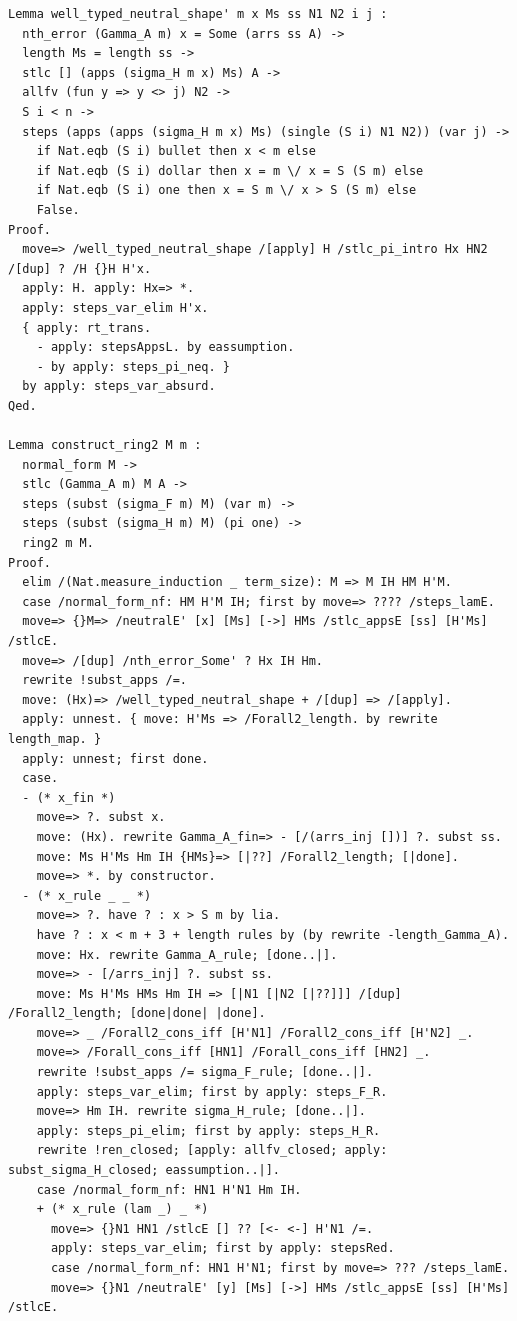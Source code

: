 \documentclass[10pt,a4paper]{amsart}
\begin{document}
\begin{lstlisting}
Lemma well_typed_neutral_shape' m x Ms ss N1 N2 i j :
  nth_error (Gamma_A m) x = Some (arrs ss A) ->
  length Ms = length ss ->
  stlc [] (apps (sigma_H m x) Ms) A ->
  allfv (fun y => y <> j) N2 ->
  S i < n ->
  steps (apps (apps (sigma_H m x) Ms) (single (S i) N1 N2)) (var j) ->
    if Nat.eqb (S i) bullet then x < m else
    if Nat.eqb (S i) dollar then x = m \/ x = S (S m) else
    if Nat.eqb (S i) one then x = S m \/ x > S (S m) else
    False.
Proof.
  move=> /well_typed_neutral_shape /[apply] H /stlc_pi_intro Hx HN2 /[dup] ? /H {}H H'x.
  apply: H. apply: Hx=> *.
  apply: steps_var_elim H'x.
  { apply: rt_trans.
    - apply: stepsAppsL. by eassumption.
    - by apply: steps_pi_neq. }
  by apply: steps_var_absurd.
Qed.

Lemma construct_ring2 M m :
  normal_form M ->
  stlc (Gamma_A m) M A ->
  steps (subst (sigma_F m) M) (var m) ->
  steps (subst (sigma_H m) M) (pi one) ->
  ring2 m M.
Proof.
  elim /(Nat.measure_induction _ term_size): M => M IH HM H'M.
  case /normal_form_nf: HM H'M IH; first by move=> ???? /steps_lamE.
  move=> {}M=> /neutralE' [x] [Ms] [->] HMs /stlc_appsE [ss] [H'Ms] /stlcE.
  move=> /[dup] /nth_error_Some' ? Hx IH Hm.
  rewrite !subst_apps /=.
  move: (Hx)=> /well_typed_neutral_shape + /[dup] => /[apply].
  apply: unnest. { move: H'Ms => /Forall2_length. by rewrite length_map. }
  apply: unnest; first done.
  case.
  - (* x_fin *)
    move=> ?. subst x.
    move: (Hx). rewrite Gamma_A_fin=> - [/(arrs_inj [])] ?. subst ss.
    move: Ms H'Ms Hm IH {HMs}=> [|??] /Forall2_length; [|done].
    move=> *. by constructor.
  - (* x_rule _ _ *)
    move=> ?. have ? : x > S m by lia.
    have ? : x < m + 3 + length rules by (by rewrite -length_Gamma_A).
    move: Hx. rewrite Gamma_A_rule; [done..|].
    move=> - [/arrs_inj] ?. subst ss.
    move: Ms H'Ms HMs Hm IH => [|N1 [|N2 [|??]]] /[dup] /Forall2_length; [done|done| |done].
    move=> _ /Forall2_cons_iff [H'N1] /Forall2_cons_iff [H'N2] _.
    move=> /Forall_cons_iff [HN1] /Forall_cons_iff [HN2] _.
    rewrite !subst_apps /= sigma_F_rule; [done..|].
    apply: steps_var_elim; first by apply: steps_F_R.
    move=> Hm IH. rewrite sigma_H_rule; [done..|].
    apply: steps_pi_elim; first by apply: steps_H_R.
    rewrite !ren_closed; [apply: allfv_closed; apply: subst_sigma_H_closed; eassumption..|].
    case /normal_form_nf: HN1 H'N1 Hm IH.
    + (* x_rule (lam _) _ *)
      move=> {}N1 HN1 /stlcE [] ?? [<- <-] H'N1 /=.
      apply: steps_var_elim; first by apply: stepsRed.
      case /normal_form_nf: HN1 H'N1; first by move=> ??? /steps_lamE.
      move=> {}N1 /neutralE' [y] [Ms] [->] HMs /stlc_appsE [ss] [H'Ms] /stlcE.

\end{lstlisting}
\end{document}

